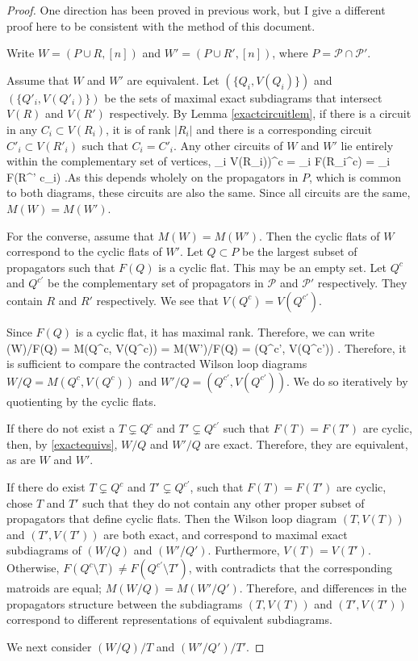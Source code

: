 \documentclass[11pt]{article}
\def\bas #1\eas{\begin{align*} #1 \end{align*}}
\newcommand{\cP}{\mathcal{P}}
\theoremstyle{remark}
\theoremstyle{definition}
\begin{document}
\begin{proof}
One direction has been proved in previous work, but I give a different proof here to be consistent with the method of this document.

Write $W = (P \cup R, [n])$ and $W' = (P \cup R', [n])$, where $P = \cP \cap \cP'$.

Assume that $W$ and $W'$ are equivalent. Let $(\{Q_i, V(Q_i)\})$ and $(\{Q'_i, V(Q'_i)\})$ be the sets of maximal exact subdiagrams that intersect $V(R)$ and $V(R')$ respectively. By Lemma \ref{exactcircuitlem}, if there is a circuit in any $C_i \subset V(R_i)$, it is of rank $|R_i|$ and there is a corresponding circuit $C'_i \subset V(R'_i)$ such that $C_i = C'_i$. Any other circuits of $W$ and $W'$ lie entirely within the complementary set of vertices, \bas(\cup_i V(R_i))^c = \cap_i F(R_i^c) = \cap_i F(R^{' c}_i) \;.\eas As this depends wholely on the propagators in $P$, which is common to both diagrams, these circuits are also the same. Since all circuits are the same, $M(W) = M(W')$.

For the converse, assume that $M(W) = M(W')$. Then the cyclic flats of $W$ correspond to the cyclic flats of $W'$. Let $Q \subset P$ be the largest subset of propagators such that $F(Q)$ is a cyclic flat. This may be an empty set. Let $Q^c$ and $Q^{c'}$ be the complementary set of propagators in $\cP$ and $\cP'$ respectively. They contain $R$ and $R'$ respectively. We see that $V(Q^c) = V(Q^{c'})$.

Since $F(Q)$ is a cyclic flat, it has maximal rank. Therefore, we can write \bas M(W)/F(Q) = M(Q^c, V(Q^c)) = M(W')/F(Q) = (Q^{c'}, V(Q^{c'})) \;. \eas Therefore, it is sufficient to compare the contracted Wilson loop diagrams $W/Q = M(Q^c, V(Q^c))$ and $ W'/Q = (Q^{c'}, V(Q^{c'}))$. We do so iteratively by quotienting by the cyclic flats.

If there do not exist a $T \subsetneq Q^c$ and $T' \subsetneq Q^{c'}$ such that $F(T) = F(T')$ are cyclic, then, by \ref{exactequivs}, $W/Q$ and $W'/Q$ are exact. Therefore, they are equivalent, as are $W$ and $W'$.

If there do exist $T \subsetneq Q^c$ and $T' \subsetneq Q^{c'}$, such that $F(T) = F(T')$ are cyclic, chose $T$ and $T'$ such that they do not contain any other proper subset of propagators that define cyclic flats. Then the Wilson loop diagram $(T, V(T))$ and $(T', V(T'))$ are both exact, and correspond to maximal exact subdiagrams of $(W/Q)$ and $(W'/Q')$. Furthermore, $V(T) = V(T')$. Otherwise, $F(Q^c \setminus T) \neq F(Q^{c'} \setminus T')$, with contradicts that the corresponding matroids are equal; $M(W/Q)=M(W'/Q')$. Therefore, and differences in the propagators structure between the subdiagrams $(T, V(T))$ and $(T', V(T'))$ correspond to different representations of equivalent subdiagrams.

We next consider $(W/Q)/T$ and $(W'/Q')/T'$.

\end{proof}
\end{document}
